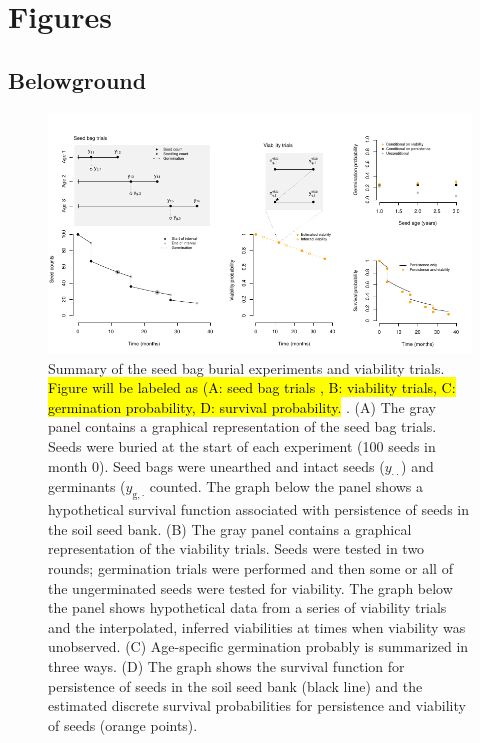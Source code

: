 \documentclass[12pt, oneside]{article}   	%
\begin{document}
\section*{Figures}
\subsection*{Belowground}


 \begin{figure}[!h]
   \centering
       \includegraphics[page=1,width=1\textwidth]{seed-bag-figure.pdf}  
    \caption{ Summary of the seed bag burial experiments and viability trials. \hl{Figure will be labeled as (A: seed bag trials , B: viability trials, C: germination probability, D: survival probability. }. (A) The gray panel contains a graphical representation of the seed bag trials. Seeds were buried at the start of each experiment (100 seeds in month 0). Seed bags were unearthed and intact seeds ($y_{\cdot \cdot}$) and germinants ($y_{\mathrm{g},\cdot}$ counted. The graph below the panel shows a hypothetical survival function associated with persistence of seeds in the soil seed bank. (B) The gray panel contains a graphical representation of the viability trials. Seeds were tested in two rounds; germination trials were performed and then some or all of the ungerminated seeds were tested for viability. The graph below the panel shows hypothetical data from a series of viability trials and the interpolated, inferred viabilities at times when viability was unobserved. (C) Age-specific germination probably is summarized in three ways. (D) The graph shows the survival function for persistence of seeds in the soil seed bank (black line) and the estimated discrete survival probabilities for persistence and viability of seeds (orange points). }
 \label{fig:seed-bag-experiments}
\end{figure}
\end{document}
